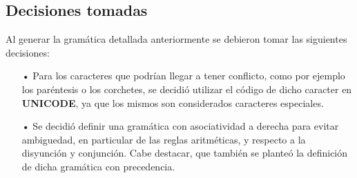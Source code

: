 \subsection{Decisiones tomadas}

Al generar la gram\'atica detallada anteriormente se debieron tomar las siguientes decisiones:

\begin{itemize}

\item[•] Para los caracteres que podr\'ian llegar a tener conflicto, como por ejemplo los par\'entesis o los corchetes, se decidi\'o utilizar el c\'odigo de dicho caracter en \textbf{UNICODE}, ya que los mismos son considerados caracteres especiales.

\item[•]Se decidi\'o definir una gram\'atica con asociatividad a derecha para evitar ambiguedad, en particular de las reglas aritm\'eticas, y respecto a la disyunci\'on y conjunci\'on. Cabe destacar, que tambi\'en se plante\'o la definici\'on de dicha gram\'atica con precedencia.


\end{itemize}


